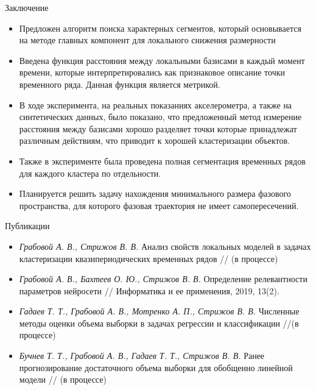 \documentclass[10pt,pdf,hyperref={unicode}]{beamer}
\begin{document}
\begin{frame}[shrink=5]{Заключение}
	\begin{itemize}
		\item Предложен алгоритм поиска характерных сегментов, который основывается на методе главных компонент для локального снижения размерности
		\item Введена функция расстояния между локальными базисами в каждый момент времени, которые интерпретировались как признаковое описание точки временного ряда. Данная функция является метрикой.
		\item В ходе эксперимента, на реальных показаниях акселерометра, а также на синтетических данных, было показано, что предложенный метод измерение расстояния между базисами хорошо разделяет точки которые принадлежат различным действиям, что приводит к хорошей кластеризации объектов.
		\item Также в эксперименте была проведена полная сегментация временных рядов для каждого кластера по отдельности.
	\end{itemize}
	
	\begin{itemize}
		\item Планируется решить задачу нахождения минимального размера фазового пространства, для которого  фазовая траектория не имеет самопересечений.
	\end{itemize}
\end{frame}
\begin{frame}{Публикации}
	\begin{itemize}
		\item \textit{Грабовой А. В., Стрижов В. В.} Анализ свойств локальных моделей в задачах кластеризации квазипериодических временных рядов // (в процессе)
		\item \textit{Грабовой А. В., Бахтеев О. Ю., Стрижов В. В.} Определение релевантности параметров нейросети // Информатика и ее применения, 2019, 13(2).
		\item \textit{Гадаев Т. Т., Грабовой А. В., Мотренко А. П., Стрижов В. В.} Численные методы оценки объема выборки в задачах регрессии и классификации //(в процессе)
		\item \textit{Бучнев Т. Т., Грабовой А. В., Гадаев Т. Т., Стрижов В. В.} Ранее прогнозирование достаточного объема выборки для обобщенно линейной модели // (в процессе)
	\end{itemize}
\end{frame}
\end{document}
